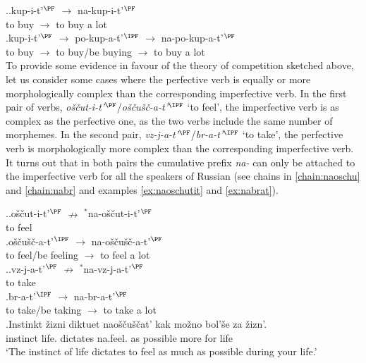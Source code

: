 \ex.\ag.\label{chain:nakupit}kup-i-t'$^{\PF}$ $\rightarrow$ na-kup-i-t'$^{\PF}$\\
{to buy} $\rightarrow$ {to buy a lot}\\
\bg.\label{chain:napokupat}kup-i-t'$^{\PF}$ $\rightarrow$ po-kup-a-t'$^{\IPF}$ $\rightarrow$ na-po-kup-a-t'$^{\PF}$\\
{to buy} $\rightarrow$ {to buy/be buying} $\rightarrow$ {to buy a lot}\\

To provide some evidence in favour of the theory of competition sketched above, let us consider some cases where the perfective verb is equally or more morphologically complex than the corresponding imperfective verb. In the first pair of verbs, \textit{o\v{s}\v{c}ut-i-t'}$^{\PF}$\slash\textit{o\v{s}\v{c}u\v{s}\v{c}-a-t'}$^{\IPF}$ `to feel', the imperfective verb is as complex as the perfective one, as the two verbs include the same number of morphemes. In the second pair, \textit{vz-j-a-t'}$^{\PF}$\slash\textit{br-a-t'}$^{\IPF}$ `to take', the perfective verb is morphologically more complex than the corresponding imperfective verb. It turns out that in both pairs the cumulative prefix \textit{na-} can only be attached to the imperfective verb for all the speakers of Russian (see chains in \ref{chain:naoschu} and \ref{chain:nabr} and examples \ref{ex:naoschutit} and \ref{ex:nabrat}). 

\ex.\label{chain:naoschu}\ag.o\v{s}\v{c}ut-i-t'$^{\PF}$ $\nrightarrow$ $^*$na-o\v{s}\v{c}ut-i-t'$^{\PF}$\label{chain:oschutit}\\
{to feel} {} {}\\
\bg.\label{chain:oschuschat}o\v{s}\v{c}u\v{s}\v{c}-a-t'$^{\IPF}$ $\rightarrow$ na-o\v{s}\v{c}u\v{s}\v{c}-a-t'$^{\PF}$\\
{to feel/be feeling} $\rightarrow$ {to feel a lot}\\

\ex.\label{chain:nabr}\ag.vz-j-a-t'$^{\PF}$ $\nrightarrow$ $^*$na-vz-j-a-t'$^{\PF}$\label{chain:navzjat}\\
{to take} {} {}\\
\bg.\label{chain:nabrat}br-a-t'$^{\IPF}$ $\rightarrow$ na-br-a-t'$^{\PF}$\\
{to take/be taking} $\rightarrow$ {to take a lot}\\

\exg.\label{ex:naoschutit}Instinkt \v{z}izni diktuet nao\v{s}\v{c}u\v{s}\v{c}at' kak mo\v{z}no bol'\v{s}e za \v{z}izn'.\\
instinct life. dictates na.feel. as possible more for life\\
\trans `The instinct of life dictates to feel as much as possible during your life.'\\

